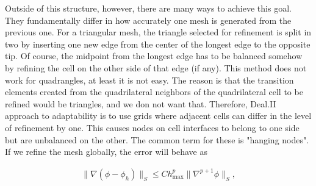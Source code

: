 \documentclass[]{pracamgr}
\begin{document}
        Outside of this structure, however, there are many ways to achieve this goal. They fundamentally differ in how accurately one mesh is generated from the previous one. For a triangular mesh, the triangle selected for refinement is split in two by inserting one new edge from the center of the longest edge to the opposite tip. Of course, the midpoint from the longest edge has to be balanced somehow by refining the cell on the other side of that edge (if any). This method does not work for quadrangles, at least it is not easy. The reason is that the transition elements created from the quadrilateral neighbors of the quadrilateral cell to be refined would be triangles, and we don not want that. Therefore, Deal.II approach to adaptability is to use grids where adjacent cells can differ in the level of refinement by one. This causes nodes on cell interfaces to belong to one side but are unbalanced on the other. The common term for these is "hanging nodes". If we refine the mesh globally, the error will behave as

        \begin{align*}
          \|\nabla(\phi-\phi_h)\|_{S} \le C h_\text{max}^p \| \nabla^{p+1} \phi \|_{S},
        \end{align*}
\end{document}
